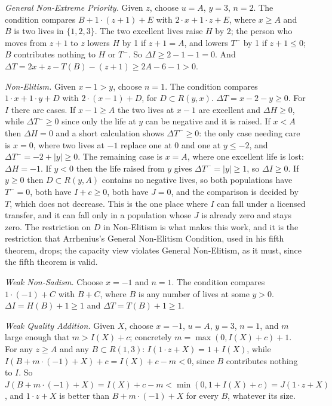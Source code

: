 \documentclass[
  11pt,
  letterpaper,
  DIV=11,
  numbers=noendperiod,
  twoside]{scrartcl}
\begin{document}
\emph{General Non-Extreme Priority.} Given \(z\), choose \(u = A\),
\(y = 3\), \(n = 2\). The condition compares \(B + 1 \cdot (z+1) + E\)
with \(2 \cdot x + 1 \cdot z + E\), where \(x \geq A\) and \(B\) is two
lives in \(\{1,2,3\}\). The two excellent lives raise \(H\) by 2; the
person who moves from \(z+1\) to \(z\) lowers \(H\) by 1 if
\(z + 1 = A\), and lowers \(T^-\) by 1 if \(z + 1 \leq 0\); \(B\)
contributes nothing to \(H\) or \(T^-\). So
\(\Delta I \geq 2 - 1 - 1 = 0\). And
\(\Delta T = 2x + z - T(B) - (z+1) \geq 2A - 6 - 1 > 0\).

\emph{Non-Elitism.} Given \(x - 1 > y\), choose \(n = 1\). The condition
compares \(1\cdot x + 1 \cdot y + D\) with \(2 \cdot (x-1) + D\), for
\(D \subset R(y,x)\). \(\Delta T = x - 2 - y \geq 0\). For \(I\) there
are cases. If \(x - 1 \geq A\) the two lives at \(x-1\) are excellent
and \(\Delta H \geq 0\), while \(\Delta T^- \geq 0\) since only the life
at \(y\) can be negative and it is raised. If \(x < A\) then
\(\Delta H = 0\) and a short calculation shows \(\Delta T^- \geq 0\):
the only case needing care is \(x = 0\), where two lives at \(-1\)
replace one at \(0\) and one at \(y \leq -2\), and
\(\Delta T^- = -2 + |y| \geq 0\). The remaining case is \(x = A\), where
one excellent life is lost: \(\Delta H = -1\). If \(y < 0\) then the
life raised from \(y\) gives \(\Delta T^- = |y| \geq 1\), so
\(\Delta I \geq 0\). If \(y \geq 0\) then \(D \subset R(y, A)\) contains
no negative lives, so both populations have \(T^- = 0\), both have
\(I + c \geq 0\), both have \(J = 0\), and the comparison is decided by
\(T\), which does not decrease. This is the one place where \(I\) can
fall under a licensed transfer, and it can fall only in a population
whose \(J\) is already zero and stays zero. The restriction on \(D\) in
Non-Elitism is what makes this work, and it is the restriction that
Arrhenius's General Non-Elitism Condition, used in his fifth theorem,
drops; the capacity view violates General Non-Elitism, as it must, since
the fifth theorem is valid.

\emph{Weak Non-Sadism.} Choose \(x = -1\) and \(n = 1\). The condition
compares \(1 \cdot (-1) + C\) with \(B + C\), where \(B\) is any number
of lives at some \(y > 0\). \(\Delta I = H(B) + 1 \geq 1\) and
\(\Delta T = T(B) + 1 \geq 1\).

\emph{Weak Quality Addition.} Given \(X\), choose \(x = -1\), \(u = A\),
\(y = 3\), \(n = 1\), and \(m\) large enough that \(m > I(X) + c\);
concretely \(m = \max(0, I(X) + c) + 1\). For any \(z \geq A\) and any
\(B \subset R(1,3)\): \(I(1 \cdot z + X) = 1 + I(X)\), while
\(I(B + m \cdot (-1) + X) + c = I(X) + c - m < 0\), since \(B\)
contributes nothing to \(I\). So
\(J(B + m\cdot(-1) + X) = I(X) + c - m < \min(0, 1 + I(X) + c) = J(1 \cdot z + X)\),
and \(1 \cdot z + X\) is better than \(B + m \cdot (-1) + X\) for every
\(B\), whatever its size.
\end{document}
